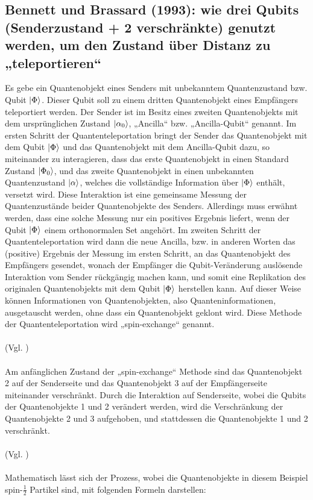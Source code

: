 \subsection{Bennett und Brassard (1993): wie drei Qubits (Senderzustand + 2 verschränkte) genutzt werden, um den Zustand über Distanz zu „teleportieren“}
Es gebe ein Quantenobjekt eines Senders mit unbekanntem Quantenzustand bzw. Qubit \(\ket{\Phi}\). Dieser Qubit soll zu einem dritten Quantenobjekt eines Empfängers teleportiert werden. Der Sender ist im Besitz eines zweiten Quantenobjekts mit dem ursprünglichen Zustand \(\ket{\alpha_0}\), „Ancilla“ bzw. „Ancilla-Qubit“ genannt. Im ersten Schritt der Quantenteleportation bringt der Sender das Quantenobjekt mit dem Qubit \(\ket{\Phi}\) und das Quantenobjekt mit dem Ancilla-Qubit dazu, so miteinander zu interagieren, dass das erste Quantenobjekt in einen Standard Zustand \(\ket{\Phi_0}\), und das zweite Quantenobjekt in einen unbekannten Quantenzustand \(\ket{\alpha}\), welches die vollständige Information über \(\ket{\Phi}\) enthält, versetzt wird. Diese Interaktion ist eine gemeinsame Messung der Quantenzustände beider Quantenobjekte des Senders. Allerdings muss erwähnt werden, dass eine solche Messung nur ein positives Ergebnis liefert, wenn der Qubit \(\ket{\Phi}\) einem orthonormalen Set angehört. Im zweiten Schritt der Quantenteleportation wird dann die neue Ancilla, bzw. in anderen Worten das (positive) Ergebnis der Messung im ersten Schritt, an das Quantenobjekt des Empfängers gesendet, wonach der Empfänger die Qubit-Veränderung auslösende Interaktion vom Sender rückgängig machen kann, und somit eine Replikation des originalen Quantenobjekts mit dem Qubit \(\ket{\Phi}\) herstellen kann. Auf dieser Weise können Informationen von Quantenobjekten, also Quanteninformationen, ausgetauscht werden, ohne dass ein Quantenobjekt geklont wird. Diese Methode der Quantenteleportation wird „spin-exchange“ genannt.\\
\\
(Vgl. \cite[S.1-2]{bennett_teleporting_1993})\\
\\
Am anfänglichen Zustand der „spin-exchange“ Methode sind das Quantenobjekt 2 auf der Senderseite und das Quantenobjekt 3 auf der Empfängerseite miteinander verschränkt. Durch die Interaktion auf Senderseite, wobei die Qubits der Quantenobjekte 1 und 2 verändert werden, wird die Verschränkung der Quantenobjekte 2 und 3 aufgehoben, und stattdessen die Quantenobjekte 1 und 2 verschränkt.\\
\\
(Vgl. \cite[S.2-3]{bennett_teleporting_1993})\\
\\
Mathematisch lässt sich der Prozess, wobei die Quantenobjekte in diesem Beispiel spin-\(\frac{1}{2}\) Partikel sind, mit folgenden Formeln darstellen:

